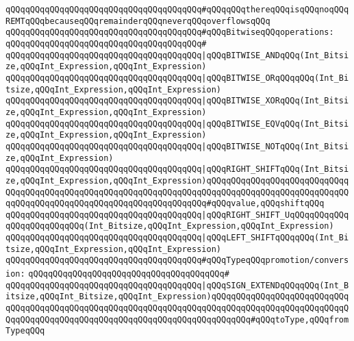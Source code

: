 \verb|qQQqqQQqqQQqqQQqqQQqqQQqqQQqqQQqqQQqqQQq#qQQqqQQqthereqQQqisqQQqnoqQQqREMTqQQqbecauseqQQqremainderqQQqneverqQQqoverflowsqQQq|\newline
\newline
\verb|qQQqqQQqqQQqqQQqqQQqqQQqqQQqqQQqqQQqqQQq#qQQqBitwiseqQQqoperations:|\newline
\verb|qQQqqQQqqQQqqQQqqQQqqQQqqQQqqQQqqQQqqQQq#|\newline
\verb|qQQqqQQqqQQqqQQqqQQqqQQqqQQqqQQqqQQqqQQq|\verb#|qQQqBITWISE_ANDqQQq(Int_Bitsize,qQQqInt_Expression,qQQqInt_Expression)#\newline
\verb|qQQqqQQqqQQqqQQqqQQqqQQqqQQqqQQqqQQqqQQq|\verb#|qQQqBITWISE_ORqQQqqQQq(Int_Bitsize,qQQqInt_Expression,qQQqInt_Expression)#\newline
\verb|qQQqqQQqqQQqqQQqqQQqqQQqqQQqqQQqqQQqqQQq|\verb#|qQQqBITWISE_XORqQQq(Int_Bitsize,qQQqInt_Expression,qQQqInt_Expression)#\newline
\verb|qQQqqQQqqQQqqQQqqQQqqQQqqQQqqQQqqQQqqQQq|\verb#|qQQqBITWISE_EQVqQQq(Int_Bitsize,qQQqInt_Expression,qQQqInt_Expression)#\newline
\verb|qQQqqQQqqQQqqQQqqQQqqQQqqQQqqQQqqQQqqQQq|\verb#|qQQqBITWISE_NOTqQQq(Int_Bitsize,qQQqInt_Expression)#\newline
\newline
\verb|qQQqqQQqqQQqqQQqqQQqqQQqqQQqqQQqqQQqqQQq|\verb#|qQQqRIGHT_SHIFTqQQq(Int_Bitsize,qQQqInt_Expression,qQQqInt_Expression)qQQqqQQqqQQqqQQqqQQqqQQqqQQqqQQqqQQqqQQqqQQqqQQqqQQqqQQqqQQqqQQqqQQqqQQqqQQqqQQqqQQqqQQqqQQqqQQqqQQqqQQqqQQqqQQqqQQqqQQqqQQqqQQqqQQqqQQqqQQq#\verb|#qQQqvalue,qQQqshiftqQQq|\newline
\verb|qQQqqQQqqQQqqQQqqQQqqQQqqQQqqQQqqQQqqQQq|\verb#|qQQqRIGHT_SHIFT_UqQQqqQQqqQQqqQQqqQQqqQQqqQQq(Int_Bitsize,qQQqInt_Expression,qQQqInt_Expression)#\newline
\verb|qQQqqQQqqQQqqQQqqQQqqQQqqQQqqQQqqQQqqQQq|\verb#|qQQqLEFT_SHIFTqQQqqQQq(Int_Bitsize,qQQqInt_Expression,qQQqInt_Expression)#\newline
\newline
\verb|qQQqqQQqqQQqqQQqqQQqqQQqqQQqqQQqqQQqqQQq#qQQqTypeqQQqpromotion/conversion:|\newline
\verb|qQQqqQQqqQQqqQQqqQQqqQQqqQQqqQQqqQQqqQQq#|\newline
\verb|qQQqqQQqqQQqqQQqqQQqqQQqqQQqqQQqqQQqqQQq|\verb#|qQQqSIGN_EXTENDqQQqqQQq(Int_Bitsize,qQQqInt_Bitsize,qQQqInt_Expression)qQQqqQQqqQQqqQQqqQQqqQQqqQQqqQQqqQQqqQQqqQQqqQQqqQQqqQQqqQQqqQQqqQQqqQQqqQQqqQQqqQQqqQQqqQQqqQQqqQQqqQQqqQQqqQQqqQQqqQQqqQQqqQQqqQQqqQQqqQQqqQQqqQQq#\verb|#qQQqtoType,qQQqfromTypeqQQq|\newline
